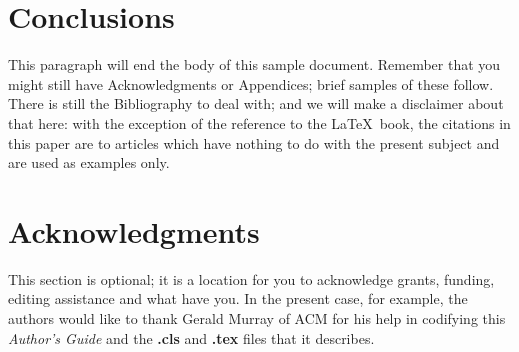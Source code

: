 \documentclass{sig-alternate}
\begin{document}
\section{Conclusions}
This paragraph will end the body of this sample document.
Remember that you might still have Acknowledgments or
Appendices; brief samples of these
follow.  There is still the Bibliography to deal with; and
we will make a disclaimer about that here: with the exception
of the reference to the \LaTeX\ book, the citations in
this paper are to articles which have nothing to
do with the present subject and are used as
examples only.

\section{Acknowledgments}
This section is optional; it is a location for you
to acknowledge grants, funding, editing assistance and
what have you.  In the present case, for example, the
authors would like to thank Gerald Murray of ACM for
his help in codifying this \textit{Author's Guide}
and the \textbf{.cls} and \textbf{.tex} files that it describes.

%

\balance
 
%
%
\end{document}

